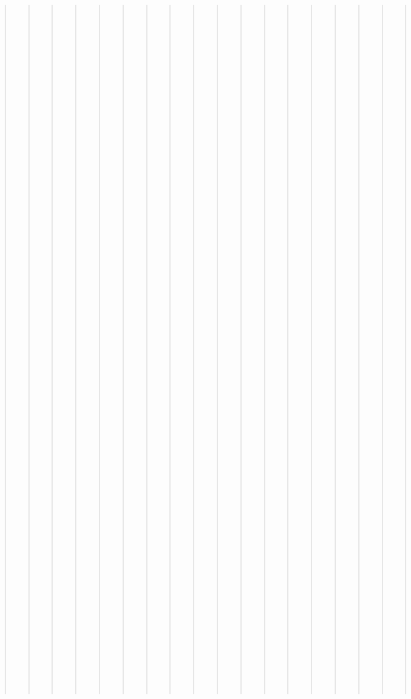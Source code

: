 \documentclass[letterpaper,10pt,english]{sphinxmanual}
\begin{document}
\begin{quote}
\begin{quote}
\begin{quote}
\begin{quote}
\begin{quote}
\begin{quote}
\begin{quote}
\begin{quote}
\begin{quote}
\begin{quote}
\begin{quote}
\begin{quote}
\begin{quote}
\begin{quote}
\begin{quote}
\begin{quote}
\begin{quote}
\begin{quote}
\begin{quote}
\begin{quote}
\begin{quote}
\begin{quote}
\begin{quote}
\begin{quote}
\begin{quote}
\begin{quote}
\begin{quote}
\begin{quote}
\begin{quote}
\begin{quote}
\begin{quote}
\begin{quote}
\begin{quote}
\begin{quote}
\begin{quote}
\begin{quote}
\begin{quote}
\begin{quote}
\begin{quote}
\begin{quote}
\begin{quote}
\begin{quote}
\begin{quote}
\begin{quote}
\begin{quote}
\begin{quote}
\begin{quote}
\begin{quote}
\begin{quote}
\begin{quote}
\begin{quote}
\begin{quote}
\begin{quote}
\begin{quote}
\begin{quote}
\begin{quote}
\begin{quote}
\begin{quote}
\begin{quote}
\begin{quote}
\begin{quote}
\begin{quote}
\begin{quote}
\begin{quote}
\begin{quote}
\begin{quote}
\begin{quote}
\begin{quote}
\begin{quote}
\begin{quote}
\begin{quote}
\begin{quote}
\begin{quote}
\begin{quote}
\begin{quote}
\begin{quote}
\begin{quote}
\begin{quote}
\begin{quote}
\begin{quote}
\begin{quote}
\begin{quote}
\begin{quote}
\begin{quote}
\begin{quote}
\begin{quote}
\begin{quote}
\begin{quote}
\begin{quote}
\begin{quote}
\begin{quote}
\begin{quote}
\begin{quote}
\begin{savenotes}
\begin{longtable}[c]{|||}
\begin{savenotes}
\begin{longtable}[c]{|||||||}
\begin{savenotes}
\begin{longtable}[c]{|||}
\begin{sphinxShadowBox}
\begin{itemize}
perref[]{}}
\begin{itemize}
\item {} 
\sphinxAtStartPar
\phantomsection\label{\detokenize{pdf:id2}}{\hyperref[\detokenize{pdf:current-manual}]{\sphinxcrossref{Current Manual}}}

\item {} 
\sphinxAtStartPar
\phantomsection\label{\detokenize{pdf:id3}}{\hyperref[\detokenize{pdf:archived-data}]{\sphinxcrossref{Archived Data}}}

\end{itemize}

\end{itemize}
\end{sphinxShadowBox}


\section{Current Manual}
\label{\detokenize{pdf:current-manual}}\begin{quote}
\begin{quote}\begin{description}
\item[{PDF Download Link:}] \leavevmode
\sphinxAtStartPar
{}

\en
\end{description}
\end{quote}
\end{quote}
\end{longtable}
\end{savenotes}
\end{longtable}
\end{savenotes}
\end{longtable}
\end{savenotes}
\end{quote}
\end{quote}
\end{quote}
\end{quote}
\end{quote}
\end{quote}
\end{quote}
\end{quote}
\end{quote}
\end{quote}
\end{quote}
\end{quote}
\end{quote}
\end{quote}
\end{quote}
\end{quote}
\end{quote}
\end{quote}
\end{quote}
\end{quote}
\end{quote}
\end{quote}
\end{quote}
\end{quote}
\end{quote}
\end{quote}
\end{quote}
\end{quote}
\end{quote}
\end{quote}
\end{quote}
\end{quote}
\end{quote}
\end{quote}
\end{quote}
\end{quote}
\end{quote}
\end{quote}
\end{quote}
\end{quote}
\end{quote}
\end{quote}
\end{quote}
\end{quote}
\end{quote}
\end{quote}
\end{quote}
\end{quote}
\end{quote}
\end{quote}
\end{quote}
\end{quote}
\end{quote}
\end{quote}
\end{quote}
\end{quote}
\end{quote}
\end{quote}
\end{quote}
\end{quote}
\end{quote}
\end{quote}
\end{quote}
\end{quote}
\end{quote}
\end{quote}
\end{quote}
\end{quote}
\end{quote}
\end{quote}
\end{quote}
\end{quote}
\end{quote}
\end{quote}
\end{quote}
\end{quote}
\end{quote}
\end{quote}
\end{quote}
\end{quote}
\end{quote}
\end{quote}
\end{quote}
\end{quote}
\end{quote}
\end{quote}
\end{quote}
\end{quote}
\end{quote}
\end{quote}
\end{quote}
\end{quote}
\end{quote}
\end{document}
